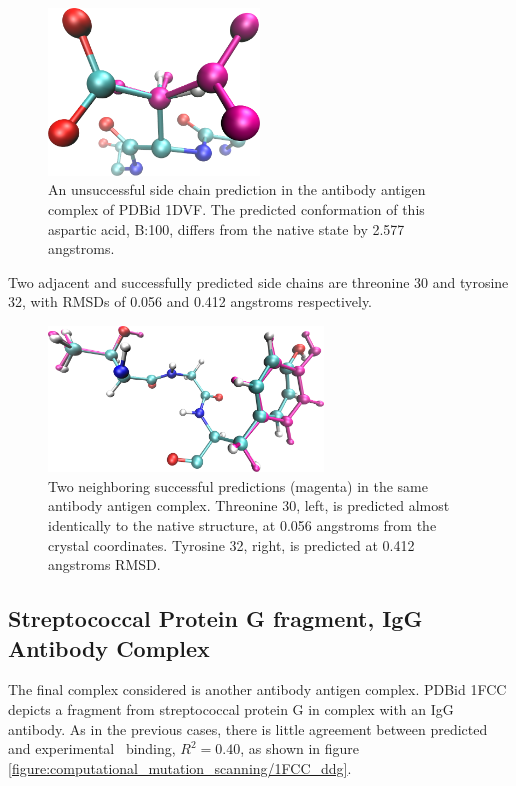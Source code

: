 \begin{figure}[h]
    \centering
    \includegraphics[width=0.5\textwidth,height=0.2\textheight,keepaspectratio]{figures/mutation_side_chain_images/1dvf_chain_b_100.png}
    \caption{An unsuccessful side chain prediction in the antibody antigen complex of PDBid 1DVF.  
    The predicted conformation of this aspartic acid, B:100, differs from the native state by 2.577 angstroms.}
    \label{figure:computational_mutation_scanning/1DVF_b_100}
\end{figure}
Two adjacent and successfully predicted side chains are threonine 30 and tyrosine 32, with RMSDs of 0.056 and 0.412 angstroms respectively.
\begin{figure}[h]
    \centering
    \includegraphics[width=0.65\textwidth,height=0.3\textheight,keepaspectratio]{figures/mutation_side_chain_images/1dvf_chain_b_30_and_32.png}
    \caption{Two neighboring successful predictions (magenta) in the same antibody antigen complex.
    Threonine 30, left, is predicted almost identically to the native structure, at 0.056 angstroms from the crystal coordinates.
    Tyrosine 32, right, is predicted at 0.412 angstroms RMSD.}
    \label{figure:computational_mutation_scanning/1DVF_B_30_and_32}
\end{figure}

\FloatBarrier
\subsection{Streptococcal Protein G fragment, IgG Antibody Complex}
The final complex considered is another antibody antigen complex.
PDBid 1FCC depicts a fragment from streptococcal protein G in complex with an IgG antibody.
As in the previous cases, there is little agreement between predicted and experimental \ddg\ binding, $R^{2}=0.40$, as shown in figure \ref{figure:computational_mutation_scanning/1FCC_ddg}.

